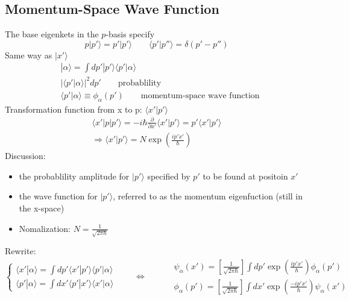 \subsection{Momentum-Space Wave Function}
The base eigenkets in the \(p\)-basis specify \[
p|p'\rangle = p'|p'\rangle\qquad \langle  p'|p''\rangle =\delta(p'-p'')\]
Same way as \({|x'\rangle}\) 
\[\begin{aligned}
	&|\alpha\rangle=\int dp' |p'\rangle\langle p'|\alpha\rangle \\
	&|\langle p'|\alpha\rangle|^2dp' \qquad\text{probablility} \\
	&\langle p'|\alpha\rangle \equiv \phi_\alpha(p') \qquad\text{momentum-space wave function}
\end{aligned}\]
Transformation function from x to p: \(\langle x'|p'\rangle\)
\[\begin{aligned}
	\langle x'|p|p'\rangle = -i\hbar\frac{\partial}{\partial x'}\langle x'|p'\rangle=p'\langle x'|p'\rangle \\
	\Rightarrow \langle x'|p'\rangle = N\exp\left(\frac{ip'x'}{\hbar}\right) 
\end{aligned}\]
Discussion:\begin{itemize}
	\item the probablility amplitude for \(|p'\rangle\) specified by \(p'\) to be found at positoin \(x'\) 
	\item the wave function for  \(|p'\rangle\), referred to as the momentum eigenfuction (still in the x-space)
	\item Nomalization: \(N = \frac{1}{\sqrt{2\pi\hbar}}\)
\end{itemize}
Rewrite:\[\begin{cases}
	\langle x'|\alpha\rangle = \int dp'\langle x'|p'\rangle\langle p'|\alpha\rangle \\
	\langle p'|\alpha\rangle = \int dx'\langle p'|x'\rangle\langle x'|\alpha\rangle 
\end{cases} \qquad \Leftrightarrow \qquad 
\begin{aligned}
	& \psi_\alpha (x')= \left[\frac{1}{\sqrt{2\pi\hbar}}\right] \int dp'\exp \left(\frac{ip'x'}{\hbar}\right) \phi_\alpha(p')\\
	& \phi_\alpha (p')= \left[\frac{1}{\sqrt{2\pi\hbar}}\right] \int dx'\exp \left(\frac{-ip'x'}{\hbar}\right) \psi_\alpha(x')
\end{aligned}\]
